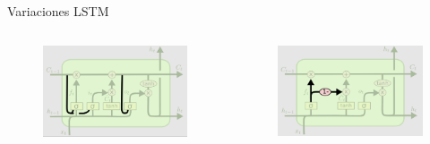 \begin{frame}{Variaciones LSTM}

    \begin{columns}
        \centering
        \begin{figure}
            \centering
            \includegraphics[width=1\linewidth]{Images/var1.png}
        \end{figure}
    
    
        \centering
        \begin{figure}
            \centering
            \includegraphics[width=1\linewidth]{Images/var2.png}
        
        \end{figure}
    \end{columns}
    
\end{frame}

